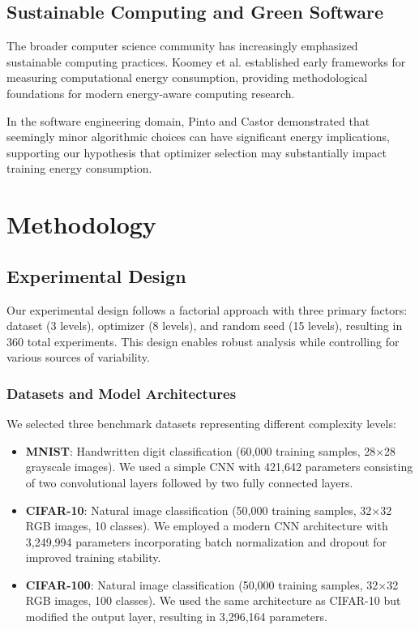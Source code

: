 \documentclass[conference]{IEEEtran}
\begin{document}
\subsection{Sustainable Computing and Green Software}

The broader computer science community has increasingly emphasized sustainable computing practices. Koomey et al. \cite{koomey2011implications} established early frameworks for measuring computational energy consumption, providing methodological foundations for modern energy-aware computing research.

In the software engineering domain, Pinto and Castor \cite{pinto2017energy} demonstrated that seemingly minor algorithmic choices can have significant energy implications, supporting our hypothesis that optimizer selection may substantially impact training energy consumption.

\section{Methodology}

\subsection{Experimental Design}

Our experimental design follows a factorial approach with three primary factors: dataset (3 levels), optimizer (8 levels), and random seed (15 levels), resulting in 360 total experiments. This design enables robust analysis while controlling for various sources of variability.

\subsubsection{Datasets and Model Architectures}

We selected three benchmark datasets representing different complexity levels:

\begin{itemize}
    \item \textbf{MNIST}: Handwritten digit classification (60,000 training samples, 28$\times$28 grayscale images). We used a simple CNN with 421,642 parameters consisting of two convolutional layers followed by two fully connected layers.
    
    \item \textbf{CIFAR-10}: Natural image classification (50,000 training samples, 32$\times$32 RGB images, 10 classes). We employed a modern CNN architecture with 3,249,994 parameters incorporating batch normalization and dropout for improved training stability.
    
    \item \textbf{CIFAR-100}: Natural image classification (50,000 training samples, 32$\times$32 RGB images, 100 classes). We used the same architecture as CIFAR-10 but modified the output layer, resulting in 3,296,164 parameters.
\end{itemize}
\end{document}
